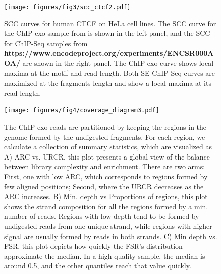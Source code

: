 \documentclass{bmcart}
\newcommand{\sig}{\sigma^{70}}
\begin{document}
\newpage

\begin{figure}[h!]
\centering
\texttt{[image: figures/fig3/scc\_ctcf2.pdf]}
\caption{SCC curves for human CTCF on HeLa cell lines.  The SCC curve
  for the ChIP-exo sample from \cite{exo1} is shown in the left panel,
  and the SCC for ChIP-Seq samples from
  \textbf{https://www.encodeproject.org/experiments/ENCSR000AOA/} are
  shown in the right panel. The ChIP-exo curve shows local maxima at
  the motif and read length. Both SE ChIP-Seq curves are maximized at
  the fragments length and show a local maxima at its read length. }
  \label{fig:scc_exo}
\end{figure}

\newpage

\begin{figure}[h!]
  \centering
  \texttt{[image: figures/fig4/coverage\_diagram3.pdf]}
  \caption{The ChIP-exo reads are partitioned by keeping the regions
    in the genome formed by the undigested fragments. For each region,
    we calculate a collection of summary statistics, which are
    visualized as A) ARC vs. URCR, this plot presents a global view of
    the balance between library complexity and enrichment. There are
    two arms: First, one with low ARC, which corresponds to regions
    formed by few aligned positions; Second, where the URCR decreases
    as the ARC increases. B) Min. depth vs Proportions of regions,
    this plot shows the strand composition for all the regions formed
    by a min. number of reads. Regions with low depth tend to be
    formed by undigested reads from one unique strand, while regions
    with higher signal are usually formed by reads in both strands. C)
    Min depth vs. FSR, this plot depicts how quickly the FSR's
    distribution approximate the median. In a high quality sample, the
    median is around 0.5, and the other quantiles reach that value
    quickly.}
  \label{fig:qcdiagram}
\end{figure}
\end{document}
